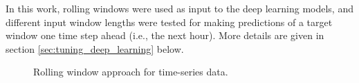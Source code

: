 In this work, rolling windows were used as input to the deep learning models, and different input window lengths were tested for making predictions of a target window one time step ahead (i.e., the next hour). More details are given in section \ref{sec:tuning_deep_learning} below.
 \begin{figure}[h]
\begin{center}
\caption{Rolling window approach for time-series data.}
\label{fig:sliding-window}
\end{center}
\end{figure}
